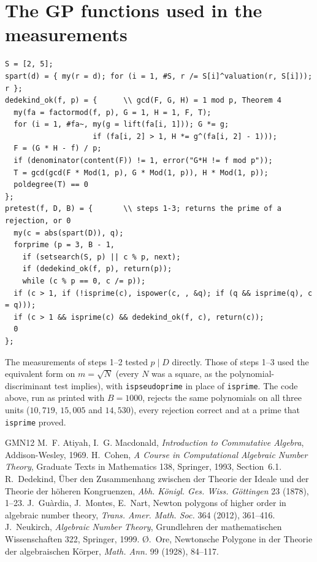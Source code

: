 \documentclass[10pt,a4paper]{article}
\newcommand{\code}[1]{\texttt{#1}}
\theoremstyle{plain}
\theoremstyle{definition}
\begin{document}
\appendix
\section{The GP functions used in the measurements}\label{app:gp}

\begin{verbatim}
S = [2, 5];
spart(d) = { my(r = d); for (i = 1, #S, r /= S[i]^valuation(r, S[i])); r };
dedekind_ok(f, p) = {      \\ gcd(F, G, H) = 1 mod p, Theorem 4
  my(fa = factormod(f, p), G = 1, H = 1, F, T);
  for (i = 1, #fa~, my(g = lift(fa[i, 1])); G *= g;
                    if (fa[i, 2] > 1, H *= g^(fa[i, 2] - 1)));
  F = (G * H - f) / p;
  if (denominator(content(F)) != 1, error("G*H != f mod p"));
  T = gcd(gcd(F * Mod(1, p), G * Mod(1, p)), H * Mod(1, p));
  poldegree(T) == 0
};
pretest(f, D, B) = {       \\ steps 1-3; returns the prime of a rejection, or 0
  my(c = abs(spart(D)), q);
  forprime (p = 3, B - 1,
    if (setsearch(S, p) || c % p, next);
    if (dedekind_ok(f, p), return(p));
    while (c % p == 0, c /= p));
  if (c > 1, if (!isprime(c), ispower(c, , &q); if (q && isprime(q), c = q)));
  if (c > 1 && isprime(c) && dedekind_ok(f, c), return(c));
  0
};
\end{verbatim}

\noindent The measurements of steps 1--2 tested $p\mid D$ directly.  Those of steps 1--3 used the equivalent form on
$m=\sqrt N$ (every $N$ was a square, as the polynomial-discriminant test implies), with \code{ispseudoprime} in place of
\code{isprime}.  The code above, run as printed with $B=1000$, rejects the same polynomials on all three units ($10{,}719$,
$15{,}005$ and $14{,}530$), every rejection correct and at a prime that \code{isprime} proved.

\begin{thebibliography}{GMN12}
 M.~F. Atiyah, I.~G. Macdonald, \emph{Introduction to Commutative Algebra}, Addison-Wesley, 1969.
 H.~Cohen, \emph{A Course in Computational Algebraic Number Theory}, Graduate Texts in Mathematics 138,
  Springer, 1993, Section~6.1.
 R.~Dedekind, \"Uber den Zusammenhang zwischen der Theorie der Ideale und der Theorie der h\"oheren Kongruenzen,
  \emph{Abh. K\"onigl. Ges. Wiss. G\"ottingen} 23 (1878), 1--23.
 J.~Gu\`ardia, J.~Montes, E.~Nart, Newton polygons of higher order in algebraic number theory,
  \emph{Trans. Amer. Math. Soc.} 364 (2012), 361--416.
 J.~Neukirch, \emph{Algebraic Number Theory}, Grundlehren der mathematischen Wissenschaften 322, Springer, 1999.
 \O.~Ore, Newtonsche Polygone in der Theorie der algebraischen K\"orper, \emph{Math. Ann.} 99 (1928), 84--117.
\end{thebibliography}
\end{document}

